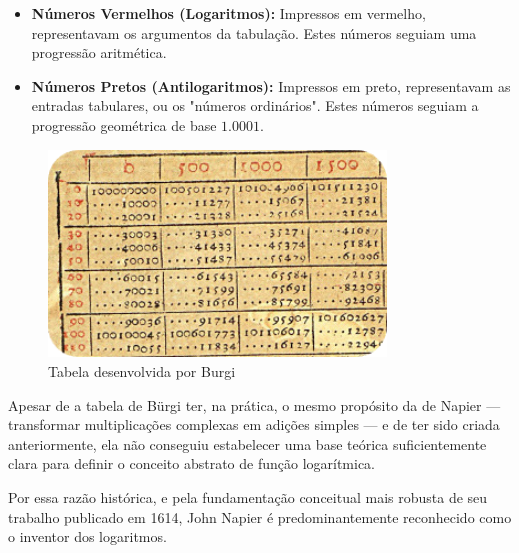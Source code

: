 \begin{itemize}
    \item \textbf{Números Vermelhos (Logaritmos):} Impressos em vermelho, representavam os argumentos da tabulação. Estes números seguiam uma progressão aritmética.
    
    \item \textbf{Números Pretos (Antilogaritmos):} Impressos em preto, representavam as entradas tabulares, ou os "números ordinários". Estes números seguiam a progressão geométrica de base $1.0001$.
\end{itemize}

\begin{figure}[H]
    \centering
    \includegraphics[height=5.5cm]{img/tabelaburgi.png}
    \caption{Tabela desenvolvida por Burgi}
\end{figure}

Apesar de a tabela de Bürgi ter, na prática, o mesmo propósito da de Napier — transformar multiplicações complexas em adições simples — e de ter sido criada anteriormente, ela não conseguiu estabelecer uma base teórica suficientemente clara para definir o conceito abstrato de função logarítmica.

Por essa razão histórica, e pela fundamentação conceitual mais robusta de seu trabalho publicado em 1614, John Napier é predominantemente reconhecido como o inventor dos logaritmos.